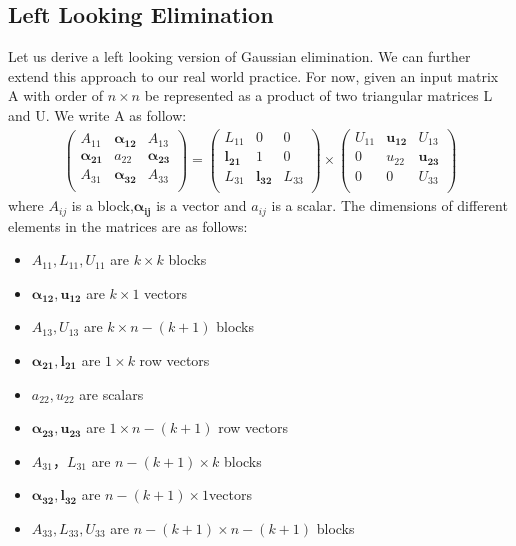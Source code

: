 \documentclass[11pt]{article}
\begin{document}
\subsection{Left Looking Elimination}
Let us derive a left looking version of Gaussian elimination. We can further extend this approach to our real world practice. For now, given an input matrix A with order of $n \times n$ be represented as a product of two triangular matrices L and U. We write A as follow:
\begin{gather}
\left( \begin{array}{ccc} A_{11} & \pmb{\alpha_{12}}  & A_{13}\\ \pmb{\alpha_{21}} & a_{22}  & \pmb{\alpha_{23}}\\  A_{31} & \pmb{\alpha_{32}}  & A_{33}\\ \end{array} \right)  = \left( \begin{array}{ccc} L_{11} & 0  & 0\\ \pmb{l_{21}} & 1  & 0\\  L_{31} & \pmb{l_{32}}  & L_{33}\\ \end{array} \right) \times \left( \begin{array}{ccc} U_{11} & \pmb{u_{12}}  & U_{13}\\ 0 & u_{22}  & \pmb{u_{23}}\\  0 & 0  & U_{33}\\ \end{array} \right)
\end{gather}
where $A_{ij}$ is a block,$\pmb{\alpha_{ij}}$ is a vector and $a_{ij}$ is a scalar. The dimensions of different elements in the matrices are as follows:
\begin{itemize}
    \item $A_{11},L_{11},U_{11}$ are $k \times k$ blocks
    \item $\pmb{\alpha_{12}}, \pmb{u_{12}}$ are $k \times 1$ vectors
    \item $A_{13},U_{13}$ are $k\times n-(k+1)$ blocks
    \item $\pmb{\alpha_{21}},\pmb{l_{21}}$ are $1 \times k$ row vectors
    \item $a_{22},u_{22}$ are scalars
    \item $\pmb{\alpha_{23}},\pmb{u_{23}}$ are $1\times n-(k+1)$ row vectors
    \item $A_{31}，L_{31}$ are $n-(k+1) \times k$ blocks
    \item $\pmb{\alpha_{32}},\pmb{l_{32}} $ are $n-(k+1)\times 1$vectors
    \item $A_{33},L_{33},U_{33}$ are $n-(k+1)\times n-(k+1)$ blocks
\end{itemize}
\end{document}
